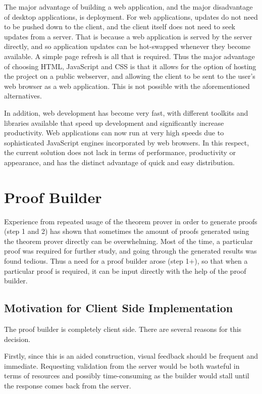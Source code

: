 \documentclass[11pt,twoside,a4paper]{report}
\begin{document}
The major advantage of building a web application, and the major disadvantage of desktop applications, is deployment. For web applications, updates do not need to be pushed down to the client, and the client itself does not need to seek updates from a server. That is because a web application is served by the server directly, and so application updates can be hot-swapped whenever they become available. A simple page refresh is all that is required. Thus the major advantage of choosing HTML, JavaScript and CSS is that it allows for the option of hosting the project on a public webserver, and allowing the client to be sent to the user's web browser as a web application. This is not possible with the aforementioned alternatives.

In addition, web development has become very fast, with different toolkits and libraries available that speed up development and significantly increase productivity. Web applications can now run at very high speeds due to sophisticated JavaScript engines incorporated by web browsers. In this respect, the current solution does not lack in terms of performance, productivity or appearance, and has the distinct advantage of quick and easy distribution.

\chapter{Proof Builder}
\label{chap:proofbuilder}
Experience from repeated usage of the theorem prover in order to generate proofs (step 1 and 2) has shown that sometimes the amount of proofs generated using the theorem prover directly can be overwhelming. Most of the time, a particular proof was required for further study, and going through the generated results was found tedious. Thus a need for a proof builder arose (step 1+), so that when a particular proof is required, it can be input directly with the help of the proof builder.

\section{Motivation for Client Side Implementation}
The proof builder is completely client side. There are several reasons for this decision. 

Firstly, since this is an aided construction, visual feedback should be frequent and immediate. Requesting validation from the server would be both wasteful in terms of resources and possibly time-consuming as the builder would stall until the response comes back from the server. 
\end{document}
